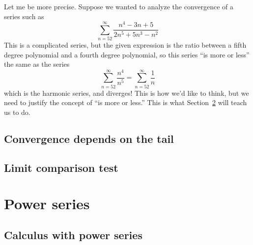 \documentclass[justified]{tufte-book}
\newcommand{\xrefn}[1]{\ref{#1}}
\begin{document}
Let me be more precise.  Suppose we wanted to analyze the convergence of a series such as
\[
\sum_{n=52}^\infty \frac{n^4 - 3n + 5}{2n^5 + 5n^3 - n^2}
\]
This is a complicated series, but the given expression is the ratio
between a fifth degree polynomial and a fourth degree polynomial, so this series ``is more or less'' the same as the series
\[
\sum_{n=52}^\infty \frac{n^4}{n^5} = \sum_{n=52}^\infty \frac{1}{n}
\]
which is the harmonic series, and diverges!  This is how we'd like to
think, but we need to justify the concept of ``is more or less.''
This is what Section~\xrefn{section:limit-comparison-test} will teach
us to do.

\section{Convergence depends on the tail}
\label{section:convergence-for-tails}


\section{Limit comparison test}
\label{section:limit-comparison-test}


\chapter{Power series}
\label{chapter:power-series}






\section{Calculus with power series}
\label{section:calculus-with-power-series}

\end{document}
